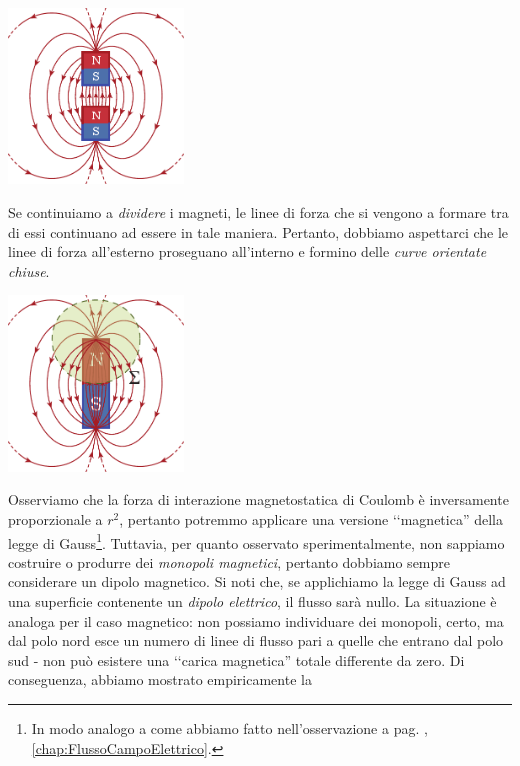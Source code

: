 \begin{center}
	\includegraphics[width=0.35\textwidth]{images/chp7/chp7leggegaussmagneti3.pdf}
\end{center}
Se continuiamo a \textit{dividere} i magneti, le linee di forza che si vengono a formare tra di essi continuano ad essere in tale maniera. Pertanto, dobbiamo aspettarci che le linee di forza all'esterno proseguano all'interno e formino delle \textit{curve orientate chiuse}.
\begin{center}
	\includegraphics[width=0.35\textwidth]{images/chp7/chp7leggegaussmagneti4.pdf}
\end{center}
Osserviamo che la forza di interazione magnetostatica di Coulomb è inversamente proporzionale a $r^2$, pertanto potremmo applicare una versione ‘‘magnetica'' della legge di Gauss\footnote{In modo analogo a come abbiamo fatto nell'osservazione a pag. \pageref{LeggeGaussMoltoGeneralizzata}, \autoref{chap:FlussoCampoElettrico}.}. Tuttavia, per quanto osservato sperimentalmente, non sappiamo costruire o produrre dei \textit{monopoli magnetici}, pertanto dobbiamo sempre considerare un dipolo magnetico.
Si noti che, se applichiamo la legge di Gauss ad una superficie contenente un \textit{dipolo elettrico}, il flusso sarà nullo. La situazione è analoga per il caso magnetico: non possiamo individuare dei monopoli, certo, ma dal polo nord esce un numero di linee di flusso pari a quelle che entrano dal polo sud - non può esistere una ‘‘carica magnetica'' totale differente da zero. Di conseguenza, abbiamo mostrato empiricamente la
